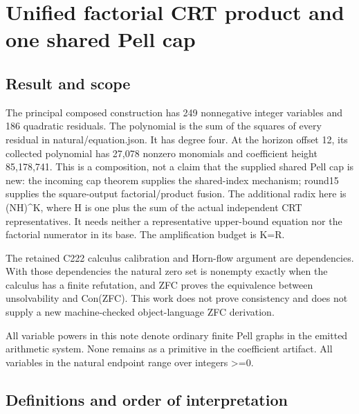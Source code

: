 \section{Unified factorial CRT product and one shared Pell cap}



\subsection{Result and scope}



The principal composed construction has 249 nonnegative integer variables and 186 quadratic residuals. The polynomial is the sum of the squares of every residual in natural/\allowbreak{}equation.json. It has degree four. At the horizon offset 12, its collected polynomial has 27,078 nonzero monomials and coefficient height 85,178,741. This is a composition, not a claim that the supplied shared Pell cap is new: the incoming cap theorem supplies the shared-index mechanism; round15 supplies the square-output factorial/\allowbreak{}product fusion. The additional radix here is (NH)\textasciicircum{}\allowbreak{}K, where H is one plus the sum of the actual independent CRT representatives. It needs neither a representative upper-bound equation nor the factorial numerator in its base. The amplification budget is K=\allowbreak{}R.



The retained C222 calculus calibration and Horn-flow argument are dependencies. With those dependencies the natural zero set is nonempty exactly when the calculus has a finite refutation, and ZFC proves the equivalence between unsolvability and Con(ZFC). This work does not prove consistency and does not supply a new machine-checked object-language ZFC derivation.



All variable powers in this note denote ordinary finite Pell graphs in the emitted arithmetic system. None remains as a primitive in the coefficient artifact. All variables in the natural endpoint range over integers \textgreater{}\allowbreak{}=\allowbreak{}0.



\subsection{Definitions and order of interpretation}



